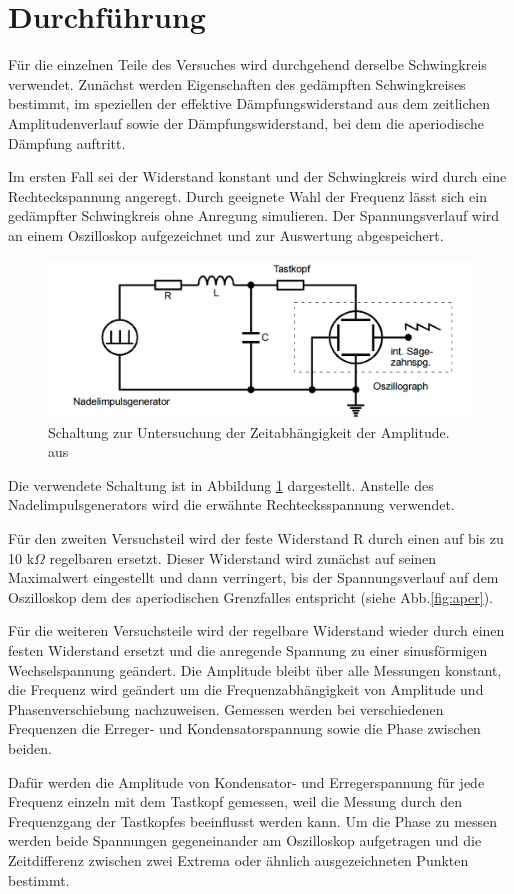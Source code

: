 \section{Durchführung}
\label{sec:Durchführung}
Für die einzelnen Teile des Versuches wird durchgehend derselbe Schwingkreis
verwendet. Zunächst werden Eigenschaften des gedämpften Schwingkreises bestimmt,
im speziellen der effektive
Dämpfungswiderstand aus dem zeitlichen Amplitudenverlauf
sowie der Dämpfungswiderstand, bei dem die aperiodische
Dämpfung auftritt.

Im ersten Fall sei der Widerstand konstant und der Schwingkreis wird durch eine
Rechteckspannung angeregt. Durch geeignete Wahl der Frequenz lässt sich ein
gedämpfter Schwingkreis ohne Anregung simulieren. Der Spannungsverlauf wird
an einem Oszilloskop aufgezeichnet und zur Auswertung abgespeichert.
\begin{figure}
  \centering
  \includegraphics[keepaspectratio, width=\textwidth]{5a.png}
  \caption{Schaltung zur Untersuchung der Zeitabhängigkeit
  der Amplitude. aus\cite{protokoll}}
  \label{fig:5a}
\end{figure}
Die verwendete Schaltung ist in Abbildung \ref{fig:5a} dargestellt. Anstelle des
Nadelimpulsgenerators wird die erwähnte Rechtecksspannung verwendet.

Für den zweiten Versuchsteil wird der feste Widerstand R durch einen auf bis zu
10 k$\Omega$ regelbaren ersetzt. Dieser Widerstand wird zunächst auf seinen
Maximalwert eingestellt und dann verringert, bis der Spannungsverlauf
auf dem Oszilloskop dem des aperiodischen Grenzfalles entspricht
(siehe Abb.\ref{fig:aper}).

Für die weiteren Versuchsteile wird der regelbare Widerstand wieder durch einen
festen Widerstand ersetzt und die anregende Spannung zu einer sinusförmigen
Wechselspannung geändert. Die Amplitude bleibt über alle Messungen konstant,
die Frequenz wird geändert um die Frequenzabhängigkeit von Amplitude und
Phasenverschiebung nachzuweisen.
Gemessen werden bei verschiedenen Frequenzen die Erreger- und
Kondensatorspannung sowie die Phase zwischen beiden.

Dafür werden die Amplitude von Kondensator- und Erregerspannung für jede
Frequenz einzeln mit dem Tastkopf gemessen,
weil die Messung durch den Frequenzgang der Tastkopfes beeinflusst werden kann.
Um die Phase zu messen werden beide Spannungen gegeneinander am Oszilloskop
aufgetragen und die Zeitdifferenz zwischen zwei Extrema
oder ähnlich ausgezeichneten Punkten bestimmt.
